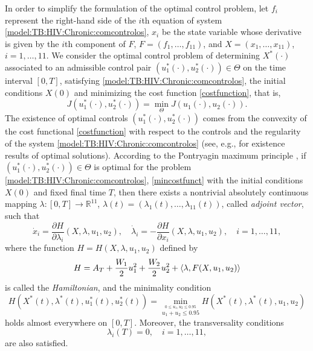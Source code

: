 \documentclass{my_aims}
\theoremstyle{definition}
\begin{document}
In order to simplify the formulation of the optimal control problem,
let $f_i$ represent the right-hand side of the $i$th equation of system
\eqref{model:TB:HIV:Chronic:comcontrolos}, $x_i$ be the state variable
whose derivative is given by the $i$th component of $F$,
$F = \left(f_1, \ldots, f_{11}\right)$, and
$X = \left(x_1, \ldots, x_{11}\right)$, $i = 1, \ldots, 11$.
We consider the optimal control problem of determining
$X^*(\cdot)$ associated to an admissible control pair
$\left(u_1^*(\cdot), u_2^*(\cdot) \right) \in \Theta$
on the time interval $[0, T]$, satisfying
\eqref{model:TB:HIV:Chronic:comcontrolos},
the initial conditions $X(0)$ and
minimizing the cost function \eqref{costfunction}, that is,
\begin{equation}
\label{mincostfunct}
J(u_1^*(\cdot), u_2^*(\cdot))
= \min_{\Theta} J(u_1(\cdot), u_2(\cdot)).
\end{equation}
The existence of optimal controls $\left(u_1^*(\cdot), u_2^*(\cdot)\right)$
comes from the convexity of the cost functional \eqref{costfunction}
with respect to the controls and the regularity of the system
\eqref{model:TB:HIV:Chronic:comcontrolos} (see, \textrm{e.g.},
\cite{Cesari_1983,Fleming_Rishel_1975}
for existence results of optimal solutions).
According to the Pontryagin maximum principle \cite{Pontryagin_et_all_1962},
if $\left(u_1^*(\cdot), u_2^*(\cdot)\right) \in \Theta$ is optimal for the problem
\eqref{model:TB:HIV:Chronic:comcontrolos}, \eqref{mincostfunct} with the initial conditions
$X(0)$ and fixed final time $T$, then there exists
a nontrivial absolutely continuous mapping $\lambda : [0, T] \to \mathbb{R}^{11}$,
$\lambda(t) = \left(\lambda_1(t), \ldots, \lambda_{11}(t)\right)$,
called \emph{adjoint vector}, such that
\begin{equation}
\label{adjsystemPMP}
\dot{x}_i = \frac{\partial H}{\partial \lambda_i}(X,\lambda,u_1, u_2),
\quad \dot{\lambda}_i = -\frac{\partial H}{\partial x_i}(X,\lambda,u_1, u_2),
\quad i = 1, \ldots, 11,
\end{equation}
where the function $H= H(X,\lambda,u_1, u_2)$ defined by
\begin{equation*}
H= A_T  + \frac{W_1}{2}u_1^2 + \frac{W_2}{2}u_2^2 + \langle\lambda,F(X,u_1, u_2)\rangle\\
\end{equation*}
is called the \emph{Hamiltonian}, and the minimality condition
\begin{equation}
\label{maxcondPMP}
H(X^*(t), \lambda^*(t), u_1^*(t), u_2^*(t))
= \min_{\stackrel{0 \leq u_1, u_2 \leq 0.95}{u_1 + u_2 \le 0.95}} H(X^*(t),\lambda^*(t), u_1, u_2)
\end{equation}
holds almost everywhere on $[0, T]$. Moreover, the transversality conditions
\begin{equation*}
\lambda_i(T) = 0, \quad i =1,\ldots, 11,
\end{equation*}
are also satisfied.
\end{document}
